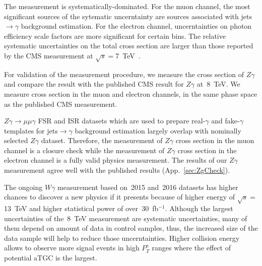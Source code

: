 The measurement is systematically-dominated. For the muon channel, the most significant sources of the sytematic uncerntainty are sources associated with jets$\rightarrow\gamma$ background estimation. For the electron channel, uncerntainties on photon efficiency scale factors are more significant for certain bins. The relative systematic uncertainties on the total cross section are larger than those reported by the CMS measurement at $\sqrt{s}=$7~TeV~\cite{ref_7TeV_CMS}.

For validation of the measurement procedure, we measure the cross section of $Z\gamma$ and compare the result with the published CMS result for $Z\gamma$ at~8~TeV. We measure cross section in the muon and electron channels, in the same phase space as the published CMS measurement. 

$Z\gamma\rightarrow\mu\mu\gamma$ FSR and ISR datasets which are used to prepare real-$\gamma$ and fake-$\gamma$ templates for jets$\rightarrow\gamma$ background estimation largely overlap with nominally selected $Z\gamma$ dataset. Therefore, the measurement of $Z\gamma$ cross section in the muon channel is a closure check while the measurement of $Z\gamma$ cross section in the electron channel is a fully valid physics measurement. The results of our $Z\gamma$ measurement agree well with the published results (App.~\ref{sec:ZgCheck}).

The ongoing $W\gamma$ measurement based on~2015 and~2016 datasets has higher chances to discover a new physics if it presents because of higher energy of $\sqrt{s}=$13~TeV and higher statistical power of over~30~fb$^{-1}$. Although the largest uncertainties of the~8~TeV measurement are systematic uncertainties, many of them depend on amount of data in control samples, thus, the increased size of the data sample will help to reduce those uncerntainties. Higher collision energy allows to observe more signal events in high $P_T^{\gamma}$ ranges where the effect of potential aTGC is the largest. 

